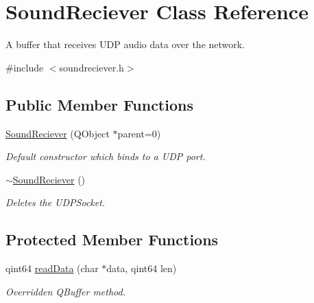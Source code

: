 \hypertarget{class_sound_reciever}{
\section{\-Sound\-Reciever \-Class \-Reference}
\label{class_sound_reciever}
}


\-A buffer that receives \-U\-D\-P audio data over the network.  




{\ttfamily \#include $<$soundreciever.\-h$>$}

\subsection*{\-Public \-Member \-Functions}
\begin{DoxyCompactItemize}
\item 
\hyperlink{class_sound_reciever_ad10126bf26dd00c6a48d763c9691e0ca}{\-Sound\-Reciever} (\-Q\-Object $\ast$parent=0)
\begin{DoxyCompactList}\small\item\em \-Default constructor which binds to a \-U\-D\-P port. \end{DoxyCompactList}\item 
\hypertarget{class_sound_reciever_ae7e8a754e275fedf25e4cc8f86f64d72}{
\hyperlink{class_sound_reciever_ae7e8a754e275fedf25e4cc8f86f64d72}{$\sim$\-Sound\-Reciever} ()}
\label{class_sound_reciever_ae7e8a754e275fedf25e4cc8f86f64d72}

\begin{DoxyCompactList}\small\item\em \-Deletes the \-U\-D\-P\-Socket. \end{DoxyCompactList}\end{DoxyCompactItemize}
\subsection*{\-Protected \-Member \-Functions}
\begin{DoxyCompactItemize}
\item 
qint64 \hyperlink{class_sound_reciever_ad2e6e099486057cce325d4775c499eb9}{read\-Data} (char $\ast$data, qint64 len)
\begin{DoxyCompactList}\small\item\em \-Overridden \-Q\-Buffer method. \end{DoxyCompactList}\end{DoxyCompactItemize}



